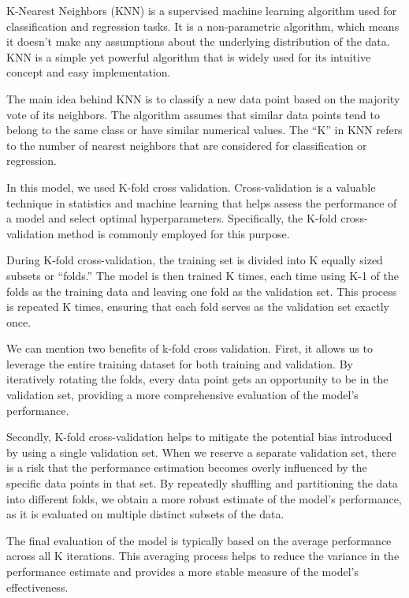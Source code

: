 \documentclass[
]{article}
\begin{document}
K-Nearest Neighbors (KNN) is a supervised machine learning algorithm
used for classification and regression tasks. It is a non-parametric
algorithm, which means it doesn't make any assumptions about the
underlying distribution of the data. KNN is a simple yet powerful
algorithm that is widely used for its intuitive concept and easy
implementation.

The main idea behind KNN is to classify a new data point based on the
majority vote of its neighbors. The algorithm assumes that similar data
points tend to belong to the same class or have similar numerical
values. The ``K'' in KNN refers to the number of nearest neighbors that
are considered for classification or regression.

In this model, we used K-fold cross validation. Cross-validation is a
valuable technique in statistics and machine learning that helps assess
the performance of a model and select optimal hyperparameters.
Specifically, the K-fold cross-validation method is commonly employed
for this purpose.

During K-fold cross-validation, the training set is divided into K
equally sized subsets or ``folds.'' The model is then trained K times,
each time using K-1 of the folds as the training data and leaving one
fold as the validation set. This process is repeated K times, ensuring
that each fold serves as the validation set exactly once.

We can mention two benefits of k-fold cross validation. First, it allows
us to leverage the entire training dataset for both training and
validation. By iteratively rotating the folds, every data point gets an
opportunity to be in the validation set, providing a more comprehensive
evaluation of the model's performance.

Secondly, K-fold cross-validation helps to mitigate the potential bias
introduced by using a single validation set. When we reserve a separate
validation set, there is a risk that the performance estimation becomes
overly influenced by the specific data points in that set. By repeatedly
shuffling and partitioning the data into different folds, we obtain a
more robust estimate of the model's performance, as it is evaluated on
multiple distinct subsets of the data.

The final evaluation of the model is typically based on the average
performance across all K iterations. This averaging process helps to
reduce the variance in the performance estimate and provides a more
stable measure of the model's effectiveness.
\end{document}
